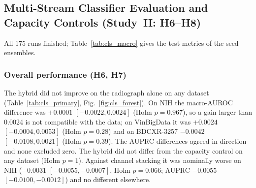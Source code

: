 \begin{table}[!t]
\centering
\caption{BDCXR-3257: pneumonia classification (normal, bacterial, viral), five folds over near-duplicate groups $\times$ three seeds;
pooled out-of-fold macro-AUROC, per-fold mean $\pm$ SD and the difference to the original image (group bootstrap).}
\label{tab:bdcxr_cls}
\end{table}

\begin{table}[!t]
\centering
\caption{BDCXR-3257: lesion audit on a fixed class-stratified subset of 300 images (1,800 sites).}
\label{tab:bdcxr_audit}
\end{table}

\subsection{Multi-Stream Classifier Evaluation and Capacity Controls (Study~II: H6--H8)}
\label{sec:res-cls}
All 175 runs finished; Table~\ref{tab:cls_macro} gives the test metrics of the seed ensembles.

\begin{table}[!t]
\centering
\caption{Test macro-AUROC and macro-AUPRC of the seed ensembles (five seeds; BDCXR-3257: out-of-fold over five folds). Descriptive; the
tests are in Tables~\ref{tab:cls_primary} and~\ref{tab:cls_groups}. orig: radiograph; soft: soft-tissue image; early: three images as
channels; hybrid: three streams; ctrl: radiograph in three streams.}
\label{tab:cls_macro}
\end{table}

\subsubsection{Overall performance (H6, H7)}
The hybrid did not improve on the radiograph alone on any dataset (Table~\ref{tab:cls_primary}, Fig.~\ref{fig:cls_forest}). On NIH the
macro-AUROC difference was $+0.0001$ $[-0.0022,0.0024]$ (Holm $p=0.967$), so a gain larger than 0.0024 is not compatible with the data; on
VinBigData it was $+0.0024$ $[-0.0004,0.0053]$ (Holm $p=0.28$) and on BDCXR-3257 $-0.0042$ $[-0.0108,0.0021]$ (Holm $p=0.39$). The AUPRC
differences agreed in direction and none excluded zero. The hybrid did not differ from the capacity control on any dataset (Holm $p=1$).
Against channel stacking it was nominally worse on NIH ($-0.0031$ $[-0.0055,-0.0007]$, Holm $p=0.066$; AUPRC $-0.0055$
$[-0.0100,-0.0012]$) and no different elsewhere.

